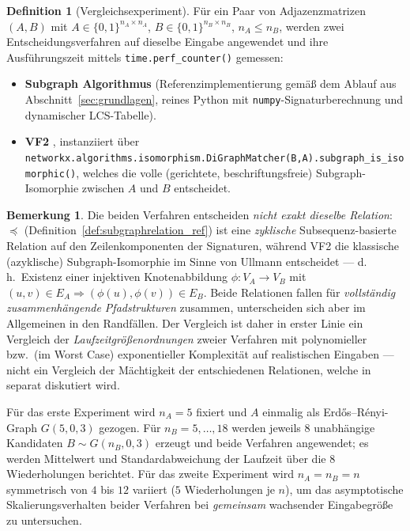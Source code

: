 \documentclass[a4paper,12pt, twoside]{report}
\theoremstyle{definition}
\newtheorem{definition}{Definition}
\newtheorem{bemerkung}{Bemerkung}
\begin{document}
\begin{definition}[Vergleichsexperiment]
	\label{def:vergleich}
	Für ein Paar von Adjazenzmatrizen $(A,B)$ mit $A\in\{0,1\}^{n_A\times n_A}$, $B\in\{0,1\}^{n_B\times n_B}$, $n_A\le n_B$, werden zwei Entscheidungsverfahren auf dieselbe Eingabe angewendet und ihre Ausführungszeit mittels \texttt{time.perf\_counter()} gemessen:
	\begin{itemize}
		\item \textbf{Subgraph Algorithmus} (Referenzimplementierung gemäß dem Ablauf aus Abschnitt~\ref{sec:grundlagen}, reines Python mit \texttt{numpy}-Signaturberechnung und dynamischer LCS-Tabelle).
		\item \textbf{VF2} \cite{cordella2004}, instanziiert über \texttt{networkx.algorithms.\allowbreak isomorphism.DiGraphMatcher(B,A).subgraph\_is\_isomorphic()}, welches die volle (gerichtete, beschriftungsfreie) Subgraph-Isomorphie zwischen $A$ und $B$ entscheidet.
	\end{itemize}
\end{definition}

\begin{bemerkung}
	Die beiden Verfahren entscheiden \emph{nicht exakt dieselbe Relation}: $\preceq$ (Definition~\ref{def:subgraphrelation_ref}) ist eine \emph{zyklische} Subsequenz-basierte Relation auf den Zeilenkomponenten der Signaturen, während VF2 die klassische (azyklische) Subgraph-Isomorphie im Sinne von Ullmann \cite{ullmann1976} entscheidet — d.\,h.\ Existenz einer injektiven Knotenabbildung $\phi:V_A\to V_B$ mit $(u,v)\in E_A\Rightarrow(\phi(u),\phi(v))\in E_B$. Beide Relationen fallen für \emph{vollständig zusammenhängende Pfadstrukturen} zusammen, unterscheiden sich aber im Allgemeinen in den Randfällen. Der Vergleich ist daher in erster Linie ein Vergleich der \emph{Laufzeitgrößenordnungen} zweier Verfahren mit polynomieller bzw.\ (im Worst Case) exponentieller Komplexität auf realistischen Eingaben — nicht ein Vergleich der Mächtigkeit der entschiedenen Relationen, welche in \cite{epp2026subgraph} separat diskutiert wird.
\end{bemerkung}

Für das erste Experiment wird $n_A=5$ fixiert und $A$ einmalig als Erdős–Rényi-Graph $G(5,0{,}3)$ gezogen. Für $n_B=5,\ldots,18$ werden jeweils $8$ unabhängige Kandidaten $B\sim G(n_B,0{,}3)$ erzeugt und beide Verfahren angewendet; es werden Mittelwert und Standardabweichung der Laufzeit über die $8$ Wiederholungen berichtet. Für das zweite Experiment wird $n_A=n_B=n$ symmetrisch von $4$ bis $12$ variiert ($5$ Wiederholungen je $n$), um das asymptotische Skalierungsverhalten beider Verfahren bei \emph{gemeinsam} wachsender Eingabegröße zu untersuchen.
\end{document}
